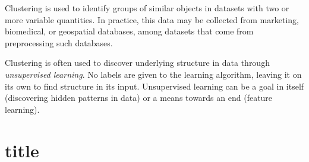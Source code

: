 Clustering is used to identify groups of similar objects in datasets with two or more variable quantities. In practice, this data may be collected from marketing, biomedical, or geospatial databases, among datasets that come from preprocessing such databases.

Clustering is often used to discover underlying structure in data through \textit{unsupervised learning}. No labels are given to the learning algorithm, leaving it on its own to find structure in its input. Unsupervised learning can be a goal in itself (discovering hidden patterns in data) or a means towards an end (feature learning). 

\section{title}